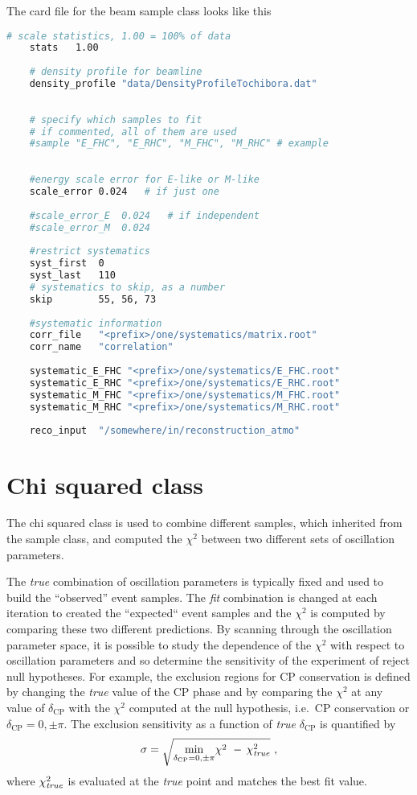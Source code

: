 \documentclass[a4paper, 11pt]{article}
\begin{document}
The card file for the beam sample class looks like this
\begin{lstlisting}[language=bash]
    # scale statistics, 1.00 = 100% of data
    stats	1.00
    
    # density profile for beamline
    density_profile	"data/DensityProfileTochibora.dat"
    
    
    # specify which samples to fit
    # if commented, all of them are used
    #sample	"E_FHC", "E_RHC", "M_FHC", "M_RHC" # example
    
    
    #energy scale error for E-like or M-like
    scale_error	0.024	# if just one
    
    #scale_error_E	0.024	# if independent
    #scale_error_M	0.024
    
    #restrict systematics
    syst_first	0
    syst_last	110
    # systematics to skip, as a number
    skip		55, 56, 73
    
    #systematic information
    corr_file	"<prefix>/one/systematics/matrix.root"
    corr_name	"correlation"
    
    systematic_E_FHC "<prefix>/one/systematics/E_FHC.root"
    systematic_E_RHC "<prefix>/one/systematics/E_RHC.root"
    systematic_M_FHC "<prefix>/one/systematics/M_FHC.root"
    systematic_M_RHC "<prefix>/one/systematics/M_RHC.root"
    
    reco_input	"/somewhere/in/reconstruction_atmo"
\end{lstlisting}


\section{Chi squared class}
\label{sec:x2}

The chi squared class is used to combine different samples, which inherited from the sample class, and %
computed the $\chi^2$ between two different sets of oscillation parameters.

The \emph{true} combination of oscillation parameters is typically fixed and used to build the %
``observed'' event samples.
The \emph{fit} combination is changed at each iteration to created the ``expected`` event samples %
and the $\chi^2$ is computed by comparing these two different predictions.
By scanning through the oscillation parameter space, it is possible to study the dependence of the $\chi^2$ %
with respect to oscillation parameters and so determine the sensitivity of the experiment of reject null hypotheses.
For example, the exclusion regions for CP conservation is defined by changing the \emph{true} value of the CP phase %
and by comparing the $\chi^2$ at any value of $\delta_\text{CP}$ with the $\chi^2$ computed at %
the null hypothesis, i.e.\ CP conservation or $\delta_\text{CP} = 0, \pm\pi$.
The exclusion sensitivity as a function of \emph{true} $\delta_\text{CP}$ %
is quantified by %
\begin{equation}
	\sigma = \sqrt{\min_{\delta_\text{CP} = 0,\pm\pi}\! \chi^2\  -\,\chi^2_\text{\emph{true}}}\ ,
\end{equation}
where $\chi^2_\text{\emph{true}}$ is evaluated at the \emph{true} point and matches the best fit value.
\end{document}
